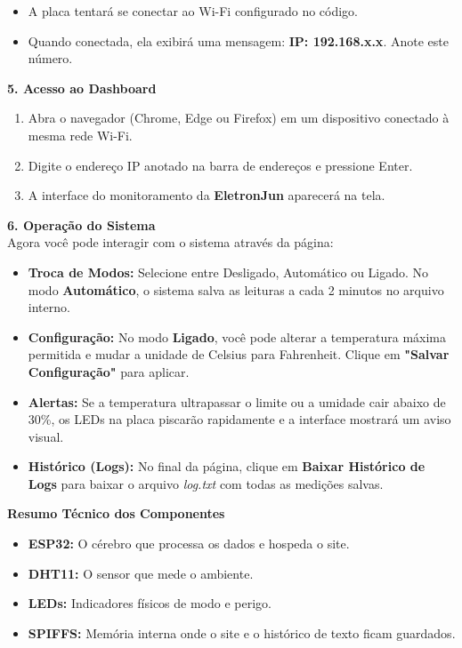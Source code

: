 \begin{itemize}
    \item A placa tentará se conectar ao Wi-Fi configurado no código.
    \item Quando conectada, ela exibirá uma mensagem: \textbf{IP: 192.168.x.x}. Anote este número.
\end{itemize}

\noindent \textbf{\large 5. Acesso ao Dashboard} \\
\begin{enumerate}
    \item Abra o navegador (Chrome, Edge ou Firefox) em um dispositivo conectado à mesma rede Wi-Fi.
    \item Digite o endereço IP anotado na barra de endereços e pressione Enter.
    \item A interface do monitoramento da \textbf{EletronJun} aparecerá na tela.
\end{enumerate}

\noindent \textbf{\large 6. Operação do Sistema} \\
Agora você pode interagir com o sistema através da página:

\begin{itemize}
    \item \textbf{Troca de Modos:} Selecione entre Desligado, Automático ou Ligado. No modo \textbf{Automático}, o sistema salva as leituras a cada 2 minutos no arquivo interno.
    \item \textbf{Configuração:} No modo \textbf{Ligado}, você pode alterar a temperatura máxima permitida e mudar a unidade de Celsius para Fahrenheit. Clique em \textbf{"Salvar Configuração"} para aplicar.
    \item \textbf{Alertas:} Se a temperatura ultrapassar o limite ou a umidade cair abaixo de 30\%, os LEDs na placa piscarão rapidamente e a interface mostrará um aviso visual.
    \item \textbf{Histórico (Logs):} No final da página, clique em \textbf{Baixar Histórico de Logs} para baixar o arquivo \textit{log.txt} com todas as medições salvas.
\end{itemize}

\vspace{1cm}

\noindent \textbf{\large Resumo Técnico dos Componentes} \\
\begin{itemize}
    \item \textbf{ESP32:} O cérebro que processa os dados e hospeda o site.
    \item \textbf{DHT11:} O sensor que mede o ambiente.
    \item \textbf{LEDs:} Indicadores físicos de modo e perigo.
    \item \textbf{SPIFFS:} Memória interna onde o site e o histórico de texto ficam guardados.
\end{itemize}